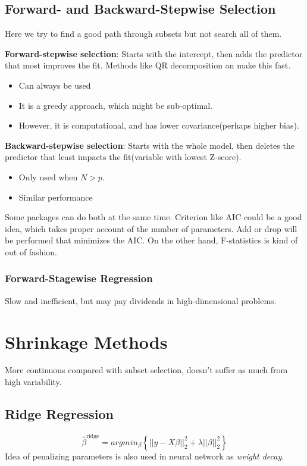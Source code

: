 \subsection{Forward- and Backward-Stepwise Selection}
Here we try to find a good path through subsets but not search all of them. 

\textbf{Forward-stepwise selection}: Starts with the intercept, then adds the 
predictor that most improves the fit. Methods like QR decomposition an make this 
fast. 
\begin{itemize}
\item Can always be used
\item It is a greedy approach, which might be sub-optimal. 
\item However, it is computational, and has lower covariance(perhaps higher bias). 
\end{itemize}

\textbf{Backward-stepwise selection}: Starts with the whole model, then deletes the 
predictor that least impacts the fit(variable with lowest Z-score). 
\begin{itemize}
\item Only used when $N>p$. 
\item Similar performance 
\end{itemize}

Some packages can do both at the same time. Criterion like AIC could be a good idea, 
which takes proper account of the number of parameters. Add or drop will be performed
that minimizes the AIC. On the other hand, F-statistics is kind of out of fashion. 

\subsubsection{Forward-Stagewise Regression}
Slow and inefficient, but may pay dividends in high-dimensional problems. 

\section{Shrinkage Methods}
More continuous compared with subset selection, doesn't suffer as much from high
variability. 
\subsection{Ridge Regression}
\begin{equation*}
\hat{\beta}^{\text{ridge}}=
argmin_{\beta}\left\{||y-X\beta||_2^2+\lambda ||\beta||_2^2\right\}
\end{equation*}
Idea of penalizing parameters is also used in neural network as \textit{weight
decay}. 

